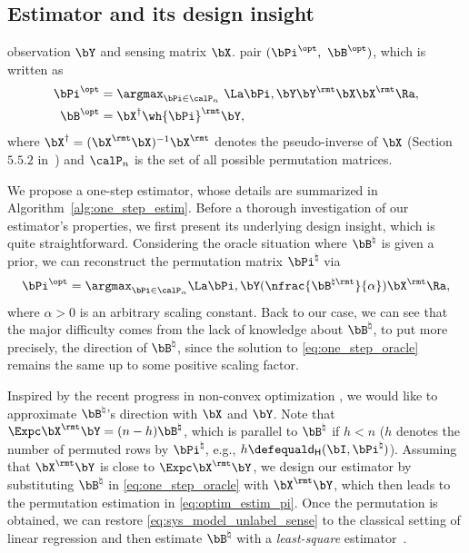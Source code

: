 \documentclass[11pt]{article}
\def \dH {\mathsf{d_H}}
\def \bPitrue {\bPi^{\natural}}
\def \bBtrue {\bB^{\natural}}
\def \bPiopt {\bPi^{\opt}}
\def \bBopt {\bB^{\opt}}
\begin{document}
\subsection{Estimator and its design insight}

\begin{algorithm}[h]
\caption{One-Step Estimator.}
\label{alg:one_step_estim}
\begin{algorithmic}
 observation $\bY$ and sensing matrix $\bX$.
 pair $(\bPiopt,~\bBopt)$, which
is written as
\begin{align}
\label{eq:optim_estim_pi}
\bPiopt &= \argmax_{\bPi \in \calP_n} \
\La \bPi, \bY\bY^{\rmt}\bX\bX^{\rmt}\Ra, \\
\bBopt &= \bX^{\dagger} \wh{\bPi}^{\rmt}\bY,
\label{eq:optim_estim_B}
\end{align}
where $\bX^{\dagger} = (\bX^{\rmt}\bX)^{-1}\bX^{\rmt}$ denotes the pseudo-inverse of
$\bX$ (Section~$5.5.2$ in~\citet{golub2012matrix}) and
$\calP_n$ is the set of all possible permutation matrices.
\end{algorithmic}
\end{algorithm}

We propose a one-step estimator, whose details are summarized
in Algorithm~\ref{alg:one_step_estim}.
Before a thorough investigation of
our estimator's properties, we first present its underlying
design insight, which is quite straightforward.
Considering the oracle situation where $\bBtrue$
is given a prior,
we can reconstruct the  permutation matrix $\bPitrue$ via
\begin{align}
\label{eq:one_step_oracle}
\bPiopt = \argmax_{\bPi\in \calP_n} \La \bPi, \bY (\nfrac{\bB^{\natural \rmt}}{\alpha})\bX^{\rmt}\Ra,
\end{align}
where $\alpha > 0$ is an arbitrary scaling constant.
Back to our case, we can see that the major difficulty
comes from the lack of knowledge about $\bBtrue$, to put
more precisely, the direction of $\bBtrue$, since the
solution to \eqref{eq:one_step_oracle} remains the same
up to some positive scaling factor.

Inspired by the recent progress in non-convex optimization
\cite{candes2010matrix, chi2019nonconvex, balakrishnan2017statistical}, we would like to approximate $\bBtrue$'s direction
with $\bX$ and $\bY$. Note that $\Expc \bX^{\rmt}\bY
=(n-h)\bBtrue$, which is parallel to $\bBtrue$ if $h < n$ ($h$ denotes the number of permuted rows by $\bPitrue$, e.g.,
$h \defequal \dH(\bI, \bPitrue)$).
Assuming that $\bX^{\rmt}\bY$ is close
to $\Expc \bX^{\rmt}\bY$,
we design our estimator
by substituting $\bBtrue$ in \eqref{eq:one_step_oracle} with
$\bX^{\rmt}\bY$, which then leads to the permutation estimation
in \eqref{eq:optim_estim_pi}. Once the permutation is obtained,
we can restore \eqref{eq:sys_model_unlabel_sense} to
the classical setting of linear regression and then estimate
$\bBtrue$ with a \emph{least-square} estimator~\citep{golub2012matrix}.
\end{document}
